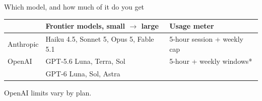 \begin{frame}{Which model, and how much of it do you get}
  \vfill
  \begin{center}
  \begin{tabular}{@{}lll@{}}
    \toprule
    & \textbf{Frontier models, small $\to$ large} & \textbf{Usage meter} \\
    \midrule
    Anthropic & Haiku 4.5, Sonnet 5, Opus 5, Fable 5.1 & 5-hour session + weekly cap \\
    OpenAI & GPT-5.6 Luna, Terra, Sol & 5-hour + weekly windows* \\
    & GPT-6 Luna, Sol, Astra & \\
    \bottomrule
  \end{tabular}
  \end{center}
  \vspace{0.5em}
  \begin{center}
    {\scriptsize * OpenAI limits vary by plan.}
  \end{center}
  \vspace{1.0em}
  \begin{center}
  \end{center}
  \vfill
\end{frame}


